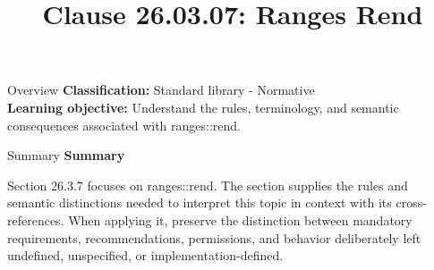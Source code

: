 \documentclass[10pt,letterpaper]{article}
\title{Clause 26.03.07: Ranges Rend}
\author{}
\date{}
\begin{document}
\maketitle
\begin{CornellOverviewBox}{Overview}
\textbf{Classification:} Standard library - Normative\\[2pt]
\textbf{Learning objective:} Understand the rules, terminology, and semantic consequences associated with ranges::rend.
\end{CornellOverviewBox}\begin{CornellSummaryBox}{Summary}
{\sffamily\bfseries\color{Accent} Summary}\par\vspace{3pt}Section 26.3.7 focuses on ranges::rend. The section supplies the rules and semantic distinctions needed to interpret this topic in context with its cross-references. When applying it, preserve the distinction between mandatory requirements, recommendations, permissions, and behavior deliberately left undefined, unspecified, or implementation-defined.
\end{CornellSummaryBox}
\end{document}
